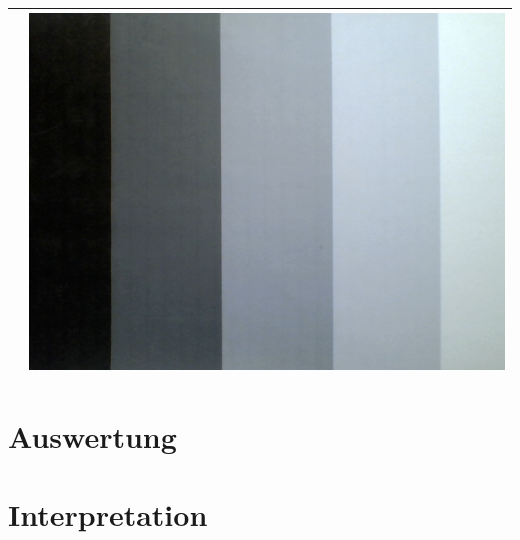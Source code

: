 \begin{tabular}{|c|c|}
 & 
\includegraphics[scale=0.25]{media/grauwertkeil.png}
 \\ 
\hline 
\end{tabular} 

\section{Auswertung}
\label{chap:VERSUCH_3_AUSWERTUNG}

\section{Interpretation}
\label{chap:VERSUCH_3_INTERPRETATION}
